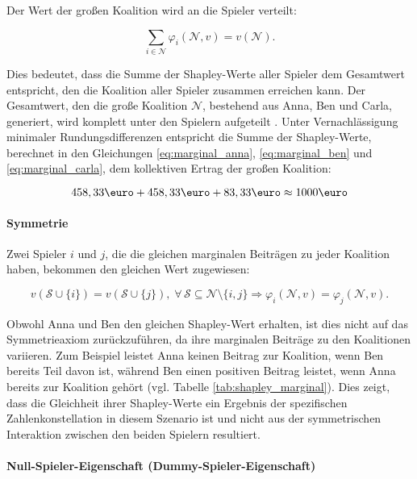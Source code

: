 Der Wert der großen Koalition wird an die Spieler verteilt:

\begin{equation}
\sum_{i \in \mathcal{N}} \varphi_i (\mathcal{N}, v) = v(\mathcal{N}).
\end{equation}

Dies bedeutet, dass die Summe der Shapley-Werte aller Spieler dem Gesamtwert entspricht, 
den die Koalition aller Spieler zusammen erreichen kann. Der Gesamtwert, den die große Koalition $\mathcal{N}$, 
bestehend aus Anna, Ben und Carla, generiert, wird komplett unter den Spielern aufgeteilt \cite[S. 22]{Molnar_2023}. 
Unter Vernachlässigung minimaler Rundungsdifferenzen entspricht die Summe der Shapley-Werte, 
berechnet in den Gleichungen \ref{eq:marginal_anna}, \ref{eq:marginal_ben} und \ref{eq:marginal_carla}, 
dem kollektiven Ertrag der großen Koalition:

\begin{equation}
  458,33 \text{\euro} + 458,33 \text{\euro} + 83,33 \text{\euro} \approx 1000 \text{\euro} 
\end{equation}


\paragraph{\rmfamily\bfseries Symmetrie}

Zwei Spieler $i$ und $j$, die die gleichen marginalen Beiträgen zu jeder Koalition haben, bekommen den gleichen Wert
zugewiesen:

\begin{equation}
v(\mathcal{S} \cup \{i\}) = v(\mathcal{S} \cup \{j\}), \; \forall\, \mathcal{S} \subseteq \mathcal{N} \setminus \{i, j\} \Rightarrow \varphi_i (\mathcal{N}, v) = \varphi_j (\mathcal{N}, v).
\end{equation}

Obwohl Anna und Ben den gleichen Shapley-Wert erhalten, ist dies nicht auf das Symmetrieaxiom zurückzuführen, 
da ihre marginalen Beiträge zu den Koalitionen variieren. Zum Beispiel leistet Anna keinen Beitrag zur Koalition, 
wenn Ben bereits Teil davon ist, während Ben einen positiven Beitrag leistet, 
wenn Anna bereits zur Koalition gehört (vgl. Tabelle \ref{tab:shapley_marginal}). Dies zeigt, dass die Gleichheit ihrer Shapley-Werte ein Ergebnis der 
spezifischen Zahlenkonstellation in diesem Szenario ist und nicht aus der symmetrischen Interaktion 
zwischen den beiden Spielern resultiert.

\paragraph{\rmfamily\bfseries Null-Spieler-Eigenschaft (Dummy-Spieler-Eigenschaft)}


